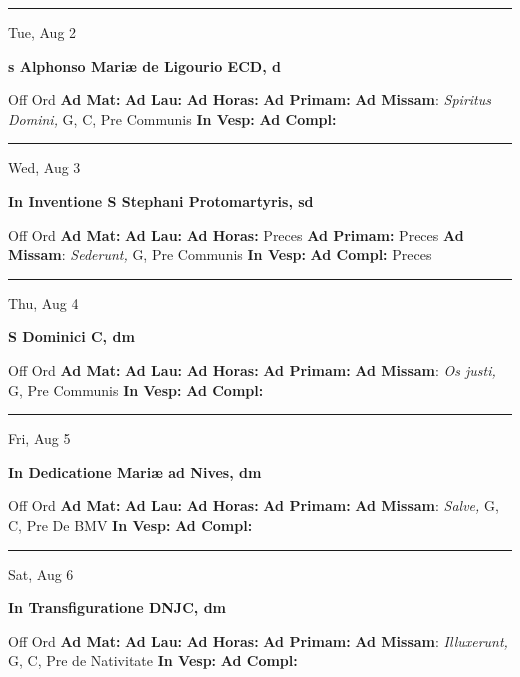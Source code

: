 \documentclass[letterpaper, 10pt]{article}
\begin{document}
\hrule
\begin{center}
Tue, Aug 2
\end{center}\textbf{ \large s Alphonso Mariæ de Ligourio ECD, \textnormal{\normalsize d}}
\begin{justify}
Off Ord
\textbf{Ad Mat: }
\textbf{Ad Lau: }
\textbf{Ad Horas: }
\textbf{Ad Primam: }
\textbf{Ad Missam}: \textit{Spiritus Domini,} G, C, Pre Communis
\textbf{In Vesp: }
\textbf{Ad Compl: }\end{justify}



\hrule
\begin{center}
Wed, Aug 3
\end{center}\textbf{ \large In Inventione S Stephani Protomartyris, \textnormal{\normalsize sd}}
\begin{justify}
Off Ord
\textbf{Ad Mat: }
\textbf{Ad Lau: }
\textbf{Ad Horas: }Preces
\textbf{Ad Primam: }Preces
\textbf{Ad Missam}: \textit{Sederunt,} G, Pre Communis
\textbf{In Vesp: }
\textbf{Ad Compl: }Preces\end{justify}



\hrule
\begin{center}
Thu, Aug 4
\end{center}\textbf{ \large S Dominici C, \textnormal{\normalsize dm}}
\begin{justify}
Off Ord
\textbf{Ad Mat: }
\textbf{Ad Lau: }
\textbf{Ad Horas: }
\textbf{Ad Primam: }
\textbf{Ad Missam}: \textit{Os justi,} G, Pre Communis
\textbf{In Vesp: }
\textbf{Ad Compl: }\end{justify}



\hrule
\begin{center}
Fri, Aug 5
\end{center}\textbf{ \large In Dedicatione Mariæ ad Nives, \textnormal{\normalsize dm}}
\begin{justify}
Off Ord
\textbf{Ad Mat: }
\textbf{Ad Lau: }
\textbf{Ad Horas: }
\textbf{Ad Primam: }
\textbf{Ad Missam}: \textit{Salve,} G, C, Pre De BMV
\textbf{In Vesp: }
\textbf{Ad Compl: }\end{justify}



\hrule
\begin{center}
Sat, Aug 6
\end{center}\textbf{ \large In Transfiguratione DNJC, \textnormal{\normalsize dm}}
\begin{justify}
Off Ord
\textbf{Ad Mat: }
\textbf{Ad Lau: }
\textbf{Ad Horas: }
\textbf{Ad Primam: }
\textbf{Ad Missam}: \textit{Illuxerunt,} G, C, Pre de Nativitate
\textbf{In Vesp: }
\textbf{Ad Compl: }\end{justify}
\end{document}
